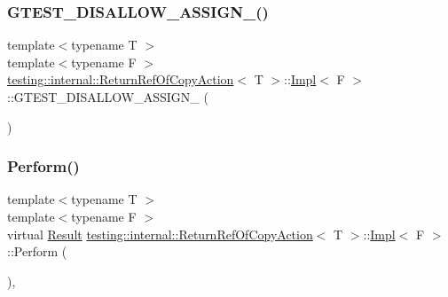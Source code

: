 \subsubsection{\texorpdfstring{G\+T\+E\+S\+T\+\_\+\+D\+I\+S\+A\+L\+L\+O\+W\+\_\+\+A\+S\+S\+I\+G\+N\+\_\+()}{GTEST\_DISALLOW\_ASSIGN\_()}}
{\footnotesize\ttfamily template$<$typename T $>$ \\
template$<$typename F $>$ \\
\hyperlink{classtesting_1_1internal_1_1ReturnRefOfCopyAction}{testing\+::internal\+::\+Return\+Ref\+Of\+Copy\+Action}$<$ T $>$\+::\hyperlink{classtesting_1_1internal_1_1ReturnRefOfCopyAction_1_1Impl}{Impl}$<$ F $>$\+::G\+T\+E\+S\+T\+\_\+\+D\+I\+S\+A\+L\+L\+O\+W\+\_\+\+A\+S\+S\+I\+G\+N\+\_\+ (\begin{DoxyParamCaption}\item[{\hyperlink{classtesting_1_1internal_1_1ReturnRefOfCopyAction_1_1Impl}{Impl}$<$ F $>$}]{ }\end{DoxyParamCaption})\hspace{0.3cm}{\ttfamily [private]}}

\mbox{\label{classtesting_1_1internal_1_1ReturnRefOfCopyAction_1_1Impl_aa208a2fce99a1e2e1913c89ec7a3bc5d}} 
\subsubsection{\texorpdfstring{Perform()}{Perform()}}
{\footnotesize\ttfamily template$<$typename T $>$ \\
template$<$typename F $>$ \\
virtual \hyperlink{classtesting_1_1ActionInterface_a7477de2fe3e4e01c59db698203acaee7}{Result} \hyperlink{classtesting_1_1internal_1_1ReturnRefOfCopyAction}{testing\+::internal\+::\+Return\+Ref\+Of\+Copy\+Action}$<$ T $>$\+::\hyperlink{classtesting_1_1internal_1_1ReturnRefOfCopyAction_1_1Impl}{Impl}$<$ F $>$\+::Perform (\begin{DoxyParamCaption}\item[{const \hyperlink{classtesting_1_1ActionInterface_af72720d864da4d606629e83edc003511}{Argument\+Tuple} \&}]{ }\end{DoxyParamCaption})\hspace{0.3cm}{\ttfamily [inline]}, {\ttfamily [virtual]}}



